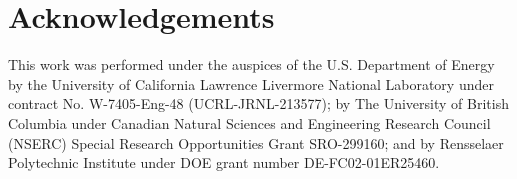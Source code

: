 \documentclass{aiaa-tc}
\begin{document}










\section*{Acknowledgements}

This work was performed under the auspices of the U.S. Department of
Energy by the University of California Lawrence Livermore National
Laboratory under contract No. W-7405-Eng-48 (UCRL-JRNL-213577); by The
University of British Columbia under Canadian Natural Sciences and
Engineering Research Council (NSERC) Special Research Opportunities
Grant SRO-299160; and by Rensselaer Polytechnic Institute under DOE
grant number DE-FC02-01ER25460.





\end{document}
